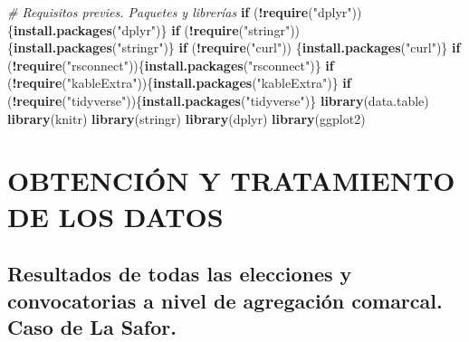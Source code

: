 \documentclass[
]{article}
\newenvironment{Shaded}{\begin{snugshade}}{\end{snugshade}}
\newcommand{\CommentTok}[1]{\textcolor[rgb]{0.56,0.35,0.01}{\textit{#1}}}
\newcommand{\ControlFlowTok}[1]{\textcolor[rgb]{0.13,0.29,0.53}{\textbf{#1}}}
\newcommand{\FunctionTok}[1]{\textcolor[rgb]{0.13,0.29,0.53}{\textbf{#1}}}
\newcommand{\NormalTok}[1]{#1}
\newcommand{\SpecialCharTok}[1]{\textcolor[rgb]{0.81,0.36,0.00}{\textbf{#1}}}
\newcommand{\StringTok}[1]{\textcolor[rgb]{0.31,0.60,0.02}{#1}}
\begin{document}
\begin{Shaded}
\begin{Highlighting}[]
\CommentTok{\# Requisitos previes. Paquetes y librerías}
\ControlFlowTok{if}\NormalTok{ (}\SpecialCharTok{!}\FunctionTok{require}\NormalTok{(}\StringTok{"dplyr"}\NormalTok{)) \{}\FunctionTok{install.packages}\NormalTok{(}\StringTok{"dplyr"}\NormalTok{)\}}
\ControlFlowTok{if}\NormalTok{ (}\SpecialCharTok{!}\FunctionTok{require}\NormalTok{(}\StringTok{"stringr"}\NormalTok{)) \{}\FunctionTok{install.packages}\NormalTok{(}\StringTok{"stringr"}\NormalTok{)\}}
\ControlFlowTok{if}\NormalTok{ (}\SpecialCharTok{!}\FunctionTok{require}\NormalTok{(}\StringTok{"curl"}\NormalTok{)) \{}\FunctionTok{install.packages}\NormalTok{(}\StringTok{"curl"}\NormalTok{)\}}
\ControlFlowTok{if}\NormalTok{ (}\SpecialCharTok{!}\FunctionTok{require}\NormalTok{(}\StringTok{"rsconnect"}\NormalTok{))\{}\FunctionTok{install.packages}\NormalTok{(}\StringTok{"rsconnect"}\NormalTok{)\}}
\ControlFlowTok{if}\NormalTok{ (}\SpecialCharTok{!}\FunctionTok{require}\NormalTok{(}\StringTok{"kableExtra"}\NormalTok{))\{}\FunctionTok{install.packages}\NormalTok{(}\StringTok{"kableExtra"}\NormalTok{)\}}
\ControlFlowTok{if}\NormalTok{ (}\SpecialCharTok{!}\FunctionTok{require}\NormalTok{(}\StringTok{"tidyverse"}\NormalTok{))\{}\FunctionTok{install.packages}\NormalTok{(}\StringTok{"tidyverse"}\NormalTok{)\}}
\FunctionTok{library}\NormalTok{(data.table)}
\FunctionTok{library}\NormalTok{(knitr)}
\FunctionTok{library}\NormalTok{(stringr)}
\FunctionTok{library}\NormalTok{(dplyr)}
\FunctionTok{library}\NormalTok{(ggplot2)}
\end{Highlighting}
\end{Shaded}

\hypertarget{obtenciuxf3n-y-tratamiento-de-los-datos}{%
\section{OBTENCIÓN Y TRATAMIENTO DE LOS
DATOS}\label{obtenciuxf3n-y-tratamiento-de-los-datos}}

\hypertarget{resultados-de-todas-las-elecciones-y-convocatorias-a-nivel-de-agregaciuxf3n-comarcal.-caso-de-la-safor.}{%
\subsection{Resultados de todas las elecciones y convocatorias a nivel
de agregación comarcal. Caso de La
Safor.}\label{resultados-de-todas-las-elecciones-y-convocatorias-a-nivel-de-agregaciuxf3n-comarcal.-caso-de-la-safor.}}
\end{document}

